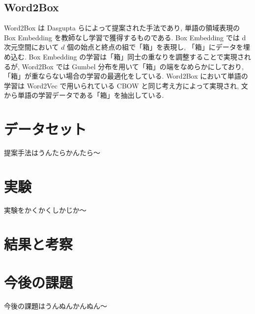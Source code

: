 \documentclass[twocolumn]{jarticle}     %
\begin{document}
\subsection{Word2Box}
Word2Box は Dasgupta らによって提案された手法であり, 単語の領域表現の Box Embedding を教師なし学習で獲得するものである. 
Box Embedding では d 次元空間において $d$ 個の始点と終点の組で「箱」を表現し, 「箱」にデータを埋め込む.
Box Embedding の学習は「箱」同士の重なりを調整することで実現されるが, Word2Box では Gumbel 分布を用いて「箱」の端をなめらかにしており, 
「箱」が重ならない場合の学習の最適化をしている. 
Word2Box において単語の学習は Word2Vec で用いられている CBOW と同じ考え方によって実現され, 文から単語の学習データである「箱」を抽出している.

\section{データセット}
提案手法はうんたらかんたら〜

\section{実験}
実験をかくかくしかじか〜

\section{結果と考察}

\section{今後の課題}
今後の課題はうんぬんかんぬん〜


\end{document}
